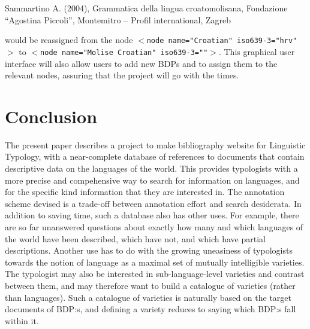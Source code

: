 \documentclass[english,11pt,twoside]{article}
\begin{document}
Sammartino A. (2004), Grammatica della lingua croatomolisana, Fondazione “Agostina Piccoli”, Montemitro – Profil international, Zagreb

would be reassigned from the node \texttt{$<$node name="Croatian" iso639-3="hrv"$>$} to \texttt{$<$node name="Molise Croatian" iso639-3=""$>$}.
This graphical user interface will also allow users to add new BDPs and to assign them to the relevant nodes, assuring that the project will go with the times.




\section{Conclusion}
The present paper describes a project to make bibliography website for
Linguistic Typology, with a near-complete database of references to
documents that contain descriptive data on the languages of the world.
This provides typologists with a more precise and compehensive way to
search for information on languages, and for the specific kind
information that they are interested in. The annotation scheme devised
is a trade-off between annotation effort and search desiderata. In
addition to saving time, such a database also has other uses.  For
example, there are so far unanswered questions about exactly how many
and which languages of the world have been described, which have not,
and which have partial descriptions. Another use has to do with the
growing uneasiness of typologists towards the notion of language as a
maximal set of mutually intelligible varieties. The typologist may
also be interested in sub-language-level varieties and contrast
between them, and may therefore want to build a catalogue of varieties
(rather than languages). Such a catalogue of varieties is naturally based
on the target documents of BDP:s, and defining a variety reduces to saying
which BDP:s fall within it.



\end{document}
